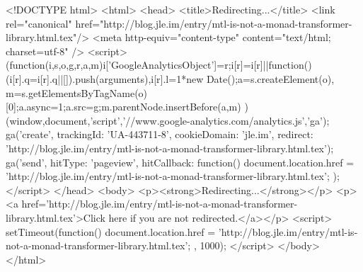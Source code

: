 <!DOCTYPE html>
<html>
<head>
<title>Redirecting...</title>
<link rel="canonical" href="http://blog.jle.im/entry/mtl-is-not-a-monad-transformer-library.html.tex"/>
<meta http-equiv="content-type" content="text/html; charset=utf-8" />
<script>
(function(i,s,o,g,r,a,m){i['GoogleAnalyticsObject']=r;i[r]=i[r]||function(){
(i[r].q=i[r].q||[]).push(arguments)},i[r].l=1*new Date();a=s.createElement(o),
m=s.getElementsByTagName(o)[0];a.async=1;a.src=g;m.parentNode.insertBefore(a,m)
})(window,document,'script','//www.google-analytics.com/analytics.js','ga');
ga('create', { trackingId: 'UA-443711-8', cookieDomain: 'jle.im', redirect: 'http://blog.jle.im/entry/mtl-is-not-a-monad-transformer-library.html.tex'});
ga('send', { hitType: 'pageview', hitCallback: function() { document.location.href = 'http://blog.jle.im/entry/mtl-is-not-a-monad-transformer-library.html.tex'; } });
</script>
</head>
<body>
  <p><strong>Redirecting...</strong></p>
  <p><a href='http://blog.jle.im/entry/mtl-is-not-a-monad-transformer-library.html.tex'>Click here if you are not redirected.</a></p>
  <script>
    setTimeout(function() { document.location.href = 'http://blog.jle.im/entry/mtl-is-not-a-monad-transformer-library.html.tex'; }, 1000);
  </script>
</body>
</html>
